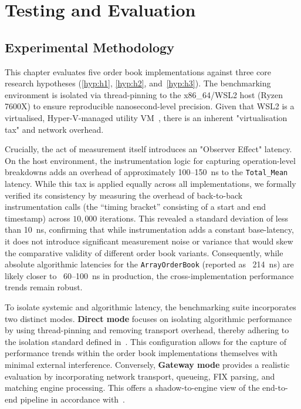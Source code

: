 \chapter{Testing and Evaluation}
\label{chap:testing_evaluation}

\section{Experimental Methodology}
\label{sec:experimental_methodology}
This chapter evaluates five order book implementations against three core
research hypotheses (\ref{hyp:h1}, \ref{hyp:h2}, and~\ref{hyp:h3}). The benchmarking environment is isolated via
thread-pinning to the x86\_64/WSL2 host (Ryzen 7600X) to ensure
reproducible nanosecond-level precision. Given that WSL2 is a virtualised, 
Hyper-V-managed utility VM~\citep{microsoft_wsl2_arch}, there is an inherent 
"virtualisation tax" and network overhead. 

Crucially, the act of measurement itself introduces an "Observer Effect" 
latency. On the host environment, the instrumentation logic for capturing 
operation-level breakdowns adds an overhead of approximately 100--150~ns to 
the \texttt{Total\_Mean} latency. While this tax is applied equally across all 
implementations, we formally verified its consistency by measuring the 
overhead of back-to-back instrumentation calls (the ``timing bracket'' 
consisting of a start and end timestamp) across $10,000$ iterations. 
This revealed a standard deviation of less than 10~ns, confirming 
that while instrumentation adds a constant base-latency, it does not 
introduce significant measurement noise or variance that would skew 
the comparative validity of different order book variants. 
Consequently, while absolute algorithmic latencies for the \texttt{ArrayOrderBook} 
(reported as ~214~ns) are likely closer to ~60--100~ns in production, the 
cross-implementation performance trends remain robust.

To isolate systemic and algorithmic latency, the benchmarking suite incorporates 
two distinct modes. \textbf{Direct mode} focuses on isolating algorithmic 
performance by using thread-pinning and removing transport overhead, thereby 
adhering to the isolation standard defined in~. This configuration 
allows for the capture of performance trends within the order book 
implementations themselves with minimal external interference. Conversely, \textbf{Gateway mode} provides a realistic evaluation by incorporating network 
transport, queueing, FIX parsing, and matching engine processing. This offers a 
shadow-to-engine view of the end-to-end pipeline in accordance with~.

